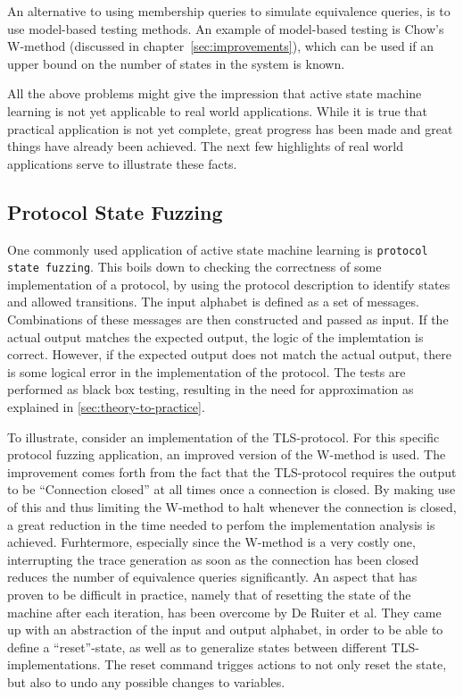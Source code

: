 \documentclass[multi,crop=false,class=article]{standalone}
\begin{document}
An alternative to using membership queries to simulate equivalence queries, is
to use model-based testing methods\cite{Broy05, Tretmans11}. An example of
model-based testing is Chow's W-method\cite{Chow78} (discussed in
chapter~\ref{sec:improvements}), which can be used if an upper bound on the
number of states in the system is known.


All the above problems might give the impression that active state machine
learning is not yet applicable to real world applications. While it is true that
practical application is not yet complete, great progress has been made and
great things have already been achieved. The next few highlights of real world
applications serve to illustrate these facts.

\subsection{Protocol State Fuzzing}
One commonly used application of active state machine learning is
\texttt{protocol state fuzzing}\cite{deRuiter15,Aarts13,Cho10,Aarts10}. This
boils down to checking the correctness of some implementation of a protocol, by
using the protocol description to identify states and allowed transitions. The
input alphabet is defined as a set of messages. Combinations of these messages
are then constructed and passed as input. If the actual output matches the 
expected output, the logic of the implemtation is correct. However, if the 
expected output does not match the actual output, there is some logical error
in the implementation of the protocol. The tests are performed as black box
testing, resulting in the need for approximation as explained in
\ref{sec:theory-to-practice}.

To illustrate, consider an implementation of the TLS-protocol\cite{deRuiter15}.
For this specific protocol fuzzing application, an improved version of the 
W-method\cite{Chow78} is used. The improvement comes forth from the fact that 
the TLS-protocol requires the output to be ``Connection closed'' at all times
once a connection is closed. By making use of this and thus limiting the
W-method to halt whenever the connection is closed, a great reduction in the
time needed to perfom the implementation analysis is achieved. Furhtermore, 
especially since the W-method is a very costly one, interrupting the trace 
generation as soon as the connection has been closed reduces the number of 
equivalence queries significantly.
An aspect that has proven to be difficult in practice, namely that of resetting
the state of the machine after each iteration, has been overcome by De Ruiter
et al. They came up with an abstraction of the input and output alphabet, in
order to be able to define a ``reset''-state, as well as to generalize states 
between different TLS-implementations. The reset command trigges actions to
not only reset the state, but also to undo any possible changes to variables.
\end{document}

